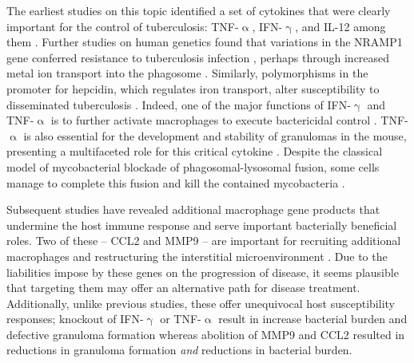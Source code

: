 The earliest studies on this topic identified a set of cytokines that were clearly important for the control of tuberculosis: TNF\hyp{}$\upalpha$, IFN\hyp{}$\upgamma$, and IL\hyp{}12 among them \citep{Flynn1993, Flynn1995, Cooper1993, Cooper1997}. Further studies on human genetics found that variations in the NRAMP1 gene conferred resistance to tuberculosis infection \citep{Bellamy1998}, perhaps through increased metal ion transport into the phagosome \citep{Davies2001a}. Similarly, polymorphisms in the promoter for hepcidin, which regulates iron transport, alter susceptibility to disseminated tuberculosis \citep{Liang2017}. Indeed, one of the major functions of IFN\hyp{}$\upgamma$ and TNF\hyp{}$\upalpha$ is to further activate macrophages to execute bactericidal control \citep{Kaufmann2002}. TNF\hyp{}$\upalpha$ is also essential for the development and stability of granulomas in the mouse, presenting a multifaceted role for this critical cytokine \citep{Chakravarty2008}. Despite the classical model of mycobacterial blockade of phagosomal\hyp{}lysosomal fusion, some cells manage to complete this fusion and kill the contained mycobacteria \citep{Kaufmann2002}. 

Subsequent studies have revealed additional macrophage gene products that undermine the host immune response and serve important bacterially beneficial roles. Two of these -- CCL2 and MMP9 -- are important for recruiting additional macrophages and restructuring the interstitial microenvironment \citep{Cambier2014b, Volkman2010}. Due to the liabilities impose by these genes on the progression of disease, it seems plausible that targeting them may offer an alternative path for disease treatment. Additionally, unlike previous studies, these offer unequivocal host susceptibility responses; knockout of IFN\hyp{}$\upgamma$ or TNF\hyp{}$\upalpha$ result in increase bacterial burden and defective granuloma formation whereas abolition of MMP9 and CCL2 resulted in reductions in granuloma formation \textit{and} reductions in bacterial burden.

